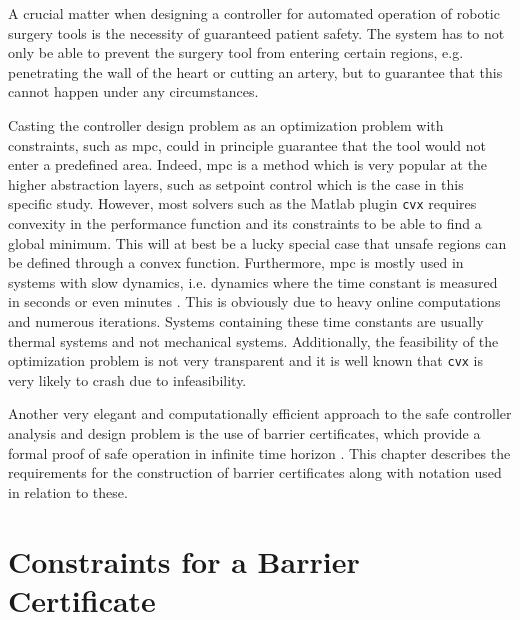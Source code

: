 A crucial matter when designing a controller for automated operation of robotic surgery tools is the necessity of guaranteed patient safety. The system has to not only be able to prevent the surgery tool from entering certain regions, e.g. penetrating the wall of the heart or cutting an artery, but to guarantee that this cannot happen under any circumstances.


Casting the controller design problem as an optimization problem with constraints, such as \gls{mpc}, could in principle guarantee that the tool would not enter a predefined area. Indeed, \gls{mpc} is a method which is very popular at the higher abstraction layers, such as setpoint control \citep{bib:mpc_simon} which is the case in this specific study. However, most solvers such as the Matlab plugin \texttt{cvx} requires convexity in the performance function and its constraints to be able to find a global minimum. This will at best be a lucky special case that unsafe regions can be defined through a convex function.  
Furthermore, \gls{mpc} is mostly used in systems with slow dynamics, i.e. dynamics where the time constant is measured in seconds or even minutes \citep{bib:mpc_slow}. This is obviously due to heavy online computations and numerous iterations. Systems containing these time constants are usually thermal systems and not mechanical systems. Additionally, the feasibility of the optimization problem is not very transparent and it is well known that \texttt{cvx} is very likely to crash due to infeasibility.

Another very elegant and computationally efficient approach to the safe controller analysis and design problem is the use of barrier certificates, which provide a formal proof of safe operation in infinite time horizon \citep{bib:prajna_framework,bib:safety}. This chapter describes the requirements for the construction of barrier certificates along with notation used in relation to these.
%





\section{Constraints for a Barrier Certificate}\label{sec:safety-def}

